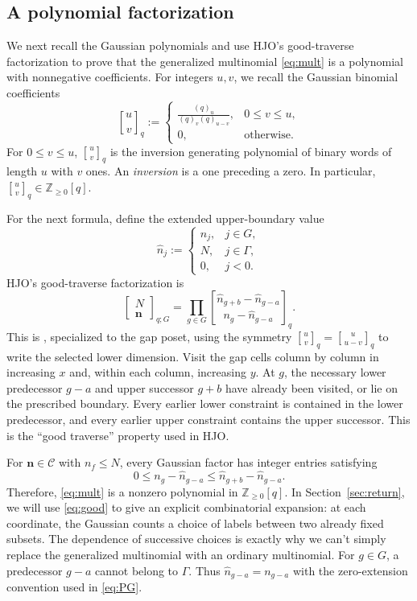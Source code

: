 \documentclass[12pt,reqno]{amsart}
\numberwithin{equation}{section}
\theoremstyle{definition}
\theoremstyle{remark}
\theoremstyle{plain}
\newcommand{\NN}{\mathbb Z_{\ge0}}
\newcommand{\nn}{\mathbf n}
\newcommand{\qbin}[2]{\genfrac{[}{]}{0pt}{}{#1}{#2}_{q}}
\newcommand{\mult}[2]{\left[\begin{matrix}#1\\#2\end{matrix}\right]_{q;G}}
\begin{document}
\subsection{A polynomial factorization}
We next recall the Gaussian polynomials and use HJO's good-traverse factorization to prove that the generalized multinomial \eqref{eq:mult} is a polynomial with nonnegative coefficients. For integers $u,v$, we recall the Gaussian binomial coefficients
\[
 \qbin uv:=\begin{cases}
\frac{(q)_u}{(q)_v(q)_{u-v}},&0\le v\le u,\\
 0,&\text{otherwise}.
 \end{cases}
\]
\noindent
For $0\le v\le u$, $\qbin uv$ is the inversion generating
polynomial of binary words of length $u$ with $v$ ones.  An {\it inversion}
is a one preceding a zero.  In particular, $\qbin uv\in\NN[q]$.


For the next formula, define the extended upper-boundary value
\begin{equation}\label{eq:boundaryextension}
 \widehat n_j:=\begin{cases}
 n_j,&j\in G,\\ N,&j\in\Gamma,\\0,&j<0.
 \end{cases}
\end{equation}
HJO's good-traverse factorization is
\begin{equation}\label{eq:good}
 \mult N\nn=\prod_{g\in G}
 \qbin{\widehat n_{g+b}-\widehat n_{g-a}}{n_g-\widehat n_{g-a}}.
\end{equation}
This is \cite[Lemma~5.9, (5.20), and Remark~6.15]{HJO}, specialized to the gap poset, using the symmetry $\qbin uv=\qbin u{u-v}$ to write the selected lower dimension.
Visit the gap cells column by column in increasing $x$ and, within each column, increasing $y$. At $g$, the necessary lower predecessor $g-a$ and upper successor $g+b$ have already been visited, or lie on the prescribed boundary. Every earlier lower constraint is contained in the lower predecessor, and every earlier upper constraint contains the upper successor.  This is the ``good traverse'' property used in HJO.

For $\nn\in\mathcal C$ with $n_f\le N$, every Gaussian factor has integer entries satisfying 
$$0\le n_g-\widehat n_{g-a}\le\widehat n_{g+b}-\widehat n_{g-a}.
$$
Therefore, \eqref{eq:mult} is a nonzero polynomial in $\NN[q]$. In Section~\ref{sec:return}, we will use \eqref{eq:good} to give an explicit combinatorial expansion: at each coordinate, the Gaussian counts a choice of labels between two already fixed subsets. The dependence of successive choices is exactly why we can't simply replace the generalized multinomial with an ordinary multinomial.
For $g\in G$, a predecessor $g-a$ cannot belong to $\Gamma$.
Thus $\widehat n_{g-a}=n_{g-a}$ with the zero-extension convention used
in \eqref{eq:PG}. 
\end{document}
